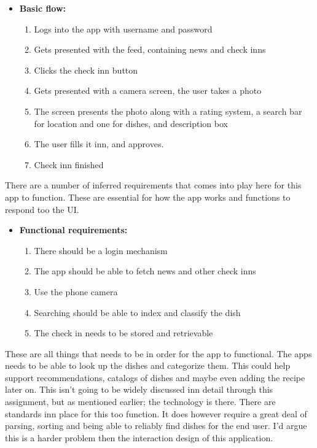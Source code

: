 \documentclass[12pt]{article}
\begin{document}
\begin{itemize}[leftmargin=-0in]
  \item[] \textbf{Basic flow:}

    \begin{enumerate}
      \item Logs into the app with username and password
      \item Gets presented with the feed, containing news and check inns
      \item Clicks the check inn button
      \item Gets presented with a camera screen, the user takes a photo
      \item The screen presents the photo along with a rating system, a search
        bar for location and one for dishes, and description box
      \item The user fills it inn, and approves.
      \item Check inn finished
    \end{enumerate}

\end{itemize}

There are a number of inferred requirements that comes into play here for this
app to function. These are essential for how the app works and functions to
respond too the UI.

\begin{itemize}[leftmargin=-0in]
  \item[] \textbf{Functional requirements:}
    \begin{enumerate}
      \item There should be a login mechanism
      \item The app should be able to fetch news and other check inns
      \item Use the phone camera
      \item Searching should be able to index and classify the dish 
      \item The check in needs to be stored and retrievable
    \end{enumerate}
\end{itemize}

These are all things that needs to be in order for the app to functional. The
apps needs to be able to look up the dishes and categorize them. This could help
support recommendations, catalogs of dishes and maybe even adding the recipe
later on. This isn't going to be widely discussed inn detail through this
assignment, but as mentioned earlier; the technology is there. There are
standards inn place for this too function. It does however require a great deal
of parsing, sorting and being able to reliably find dishes for the end user. I'd
argue this is a harder problem then the interaction design of this application.
\end{document}
